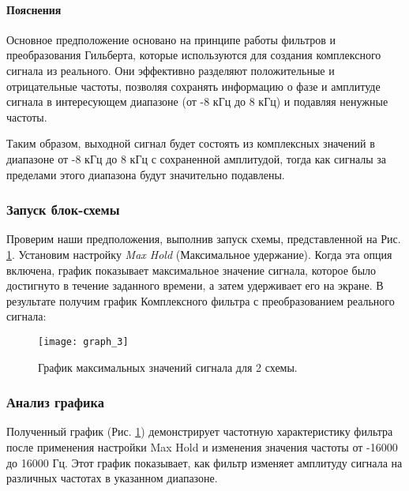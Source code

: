 \documentclass[a4paper,12pt]{extarticle}
\begin{document}
\paragraph{Пояснения}

Основное предположение основано на принципе работы фильтров и преобразования Гильберта, которые 
используются для создания комплексного сигнала из реального. Они эффективно разделяют положительные 
и отрицательные частоты, позволяя сохранять информацию о фазе и амплитуде сигнала в интересующем 
диапазоне (от -8 кГц до 8 кГц) и подавляя ненужные частоты.

Таким образом, выходной сигнал будет состоять из комплексных значений в диапазоне от -8 кГц до 8 кГц с сохраненной амплитудой, тогда как сигналы за пределами этого диапазона будут значительно подавлены.

\subsubsection{Запуск блок-схемы}
\hspace{1.15cm}Проверим наши предположения, выполнив запуск схемы, представленной на Рис. 
\ref{fig:graph_3}. Установим настройку \textit{Max Hold} (Максимальное удержание). 
Когда эта опция включена, график показывает максимальное значение сигнала, которое было 
достигнуто в течение заданного времени, а затем удерживает его на экране. В результате получим 
график Комплексного фильтра с преобразованием реального сигнала:\\
\begin{figure}[H]
    \centering
    \texttt{[image: graph\_3]}
    \caption{График максимальных значений сигнала для 2 схемы.} %
    \label{fig:graph_3} %
\end{figure}

\subsubsection{Анализ графика}

\hspace{1.15cm}Полученный график (Рис. \ref{fig:graph_3}) демонстрирует частотную характеристику 
фильтра после применения настройки Max Hold и изменения значения частоты от -16000 до 16000 Гц. 
Этот график показывает, как фильтр изменяет амплитуду сигнала на различных частотах в указанном 
диапазоне.
\end{document}
